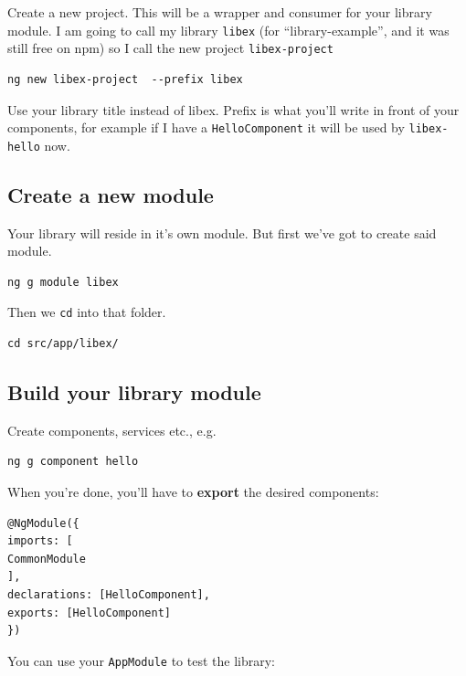 \documentclass[12pt,a4paper]{article}
\begin{document}
Create a new project. This will be a wrapper and consumer for your
library module. I am going to call my library \texttt{libex} (for
``library-example'', and it was still free on npm) so I call the new
project \texttt{libex-project}

\begin{lstlisting}
ng new libex-project  --prefix libex
\end{lstlisting}

Use your library title instead of libex. Prefix is what you'll write in
front of your components, for example if I have a
\texttt{HelloComponent} it will be used by \texttt{libex-hello} now.

\subsection{\texorpdfstring{ Create a new
module}{Create a new module}}\label{step-2-create-a-new-module}

Your library will reside in it's own module. But first we've got to
create said module.

\begin{lstlisting}
ng g module libex
\end{lstlisting}

Then we \texttt{cd} into that folder.

\begin{lstlisting}
cd src/app/libex/
\end{lstlisting}

\subsection{\texorpdfstring{ Build your library
module}{Build your library module}}\label{step-3-build-your-library-module}

Create components, services etc., e.g.

\begin{lstlisting}
ng g component hello
\end{lstlisting}

When you're done, you'll have to \textbf{export} the desired components:

\begin{lstlisting}
@NgModule({
imports: [
CommonModule
],
declarations: [HelloComponent],
exports: [HelloComponent]
})
\end{lstlisting}

You can use your \texttt{AppModule} to test the library:
\end{document}
